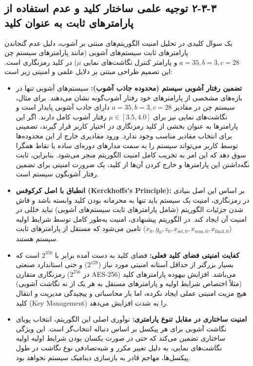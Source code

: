 \subsection{‏۳‏-‏۳‏-‏۲‏ توجیه علمی ساختار کلید و عدم استفاده از پارامترهای ثابت به عنوان کلید}
یک سوال کلیدی در تحلیل امنیت الگوریتم‌های مبتنی بر آشوب، دلیل عدم گنجاندن پارامترهای ثابت سیستم‌های آشوبی (مانند پارامترهای سیستم چن $a=35, b=3, c=28$ و پارامتر کنترل نگاشت‌های نمایی $\mu$) در کلید رمزنگاری است. این تصمیم طراحی مبتنی بر دلایل علمی و امنیتی زیر است:
\begin{itemize}
    \item \textbf{تضمین رفتار آشوبی سیستم (محدوده جاذب آشوب):} سیستم‌های آشوبی تنها در بازه‌های مشخصی از پارامترهای خود رفتار آشوب‌گونه نشان می‌دهند. برای مثال، سیستم چن در مقادیر $a=35, b=3, c=28$ دارای جاذب آشوبی پایدار است و نگاشت‌های نمایی نیز برای $\mu \in [3.5, 4.0]$ رفتار آشوب کامل دارند. اگر این پارامترها به عنوان بخشی از کلید رمزنگاری در اختیار کاربر قرار گیرند، تضمینی برای انتخاب مقادیر مناسب وجود ندارد. ورود مقادیری خارج از این محدوده‌ها توسط کاربر می‌تواند سیستم را به سمت مدارهای دوره‌ای ساده یا نقاط همگرا سوق دهد که این امر به تخریب کامل امنیت الگوریتم منجر می‌شود. بنابراین، ثابت نگه‌داشتن این پارامترها و خارج کردن آن‌ها از کلید، یک ضرورت امنیتی برای تضمین رفتار آشوبگون سیستم است.
    \item \textbf{انطباق با اصل کرکوفس (Kerckhoffs's Principle):} بر اساس این اصل بنیادی در رمزنگاری، امنیت یک سیستم باید تنها به محرمانه بودن کلید وابسته باشد و فاش شدن جزئیات الگوریتم (شامل پارامترهای ثابت سیستم‌های آشوبی) نباید خللی در امنیت آن ایجاد کند. در الگوریتم پیشنهادی، امنیت به‌طور کامل توسط شرایط اولیه ($x_0, y_0, z_0, x_{\mathrm{sel},0}, x_{\mathrm{ecm},0}, x_{\mathrm{final},0}$) تامین می‌شود که مستقل از پارامترهای ثابت سیستم هستند.
    \item \textbf{کفایت امنیتی فضای کلید فعلی:} فضای کلید به دست آمده برابر با $2^{350}$ است که بسیار بزرگتر از حداقل آستانه امنیتی مورد نیاز ($2^{128}$) و حتی استاندارد صنعتی رمزنگاری متقارن ($2^{256}$ در AES-256) می‌باشد. افزایش بیهوده پارامترهای کلید (مثلاً اختصاص شرایط اولیه و پارامترهای مستقل به هر یک از نه نگاشت آشوبی) هیچ مزیت امنیتی عملی ایجاد نکرده، اما بار محاسباتی و پیچیدگی مدیریت و انتقال کلید (Key Management) را به شدت افزایش می‌دهد.
    \item \textbf{امنیت ساختاری در مقابل تنوع پارامتری:} نوآوری اصلی این الگوریتم، انتخاب پویای نگاشت آشوبی برای هر پیکسل بر اساس دنباله انتخاب‌گر است. این ویژگی ساختاری تضمین می‌کند که حتی در صورت یکسان بودن شرایط اولیه اولیه نگاشت‌های نمایی، به دلیل تغییر مکرر و شبه‌تصادفی نوع نگاشت در طول پیکسل‌ها، مهاجم قادر به بازسازی دینامیک سیستم نخواهد بود.
\end{itemize}

